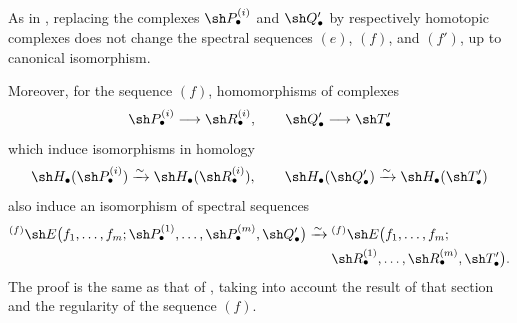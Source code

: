 \begin{remark}[6.9.5]
\label{III.6.9.5}
As in , replacing the complexes
$\sh P_\bullet^{(i)}$ and $\sh Q_\bullet'$ by respectively
homotopic complexes does not change the spectral sequences $(e)$,
$(f)$, and $(f')$, up to canonical isomorphism.

Moreover, for the sequence $(f)$, homomorphisms of complexes
\[
  \sh P_\bullet^{(i)}\longrightarrow\sh R_\bullet^{(i)},
  \qquad
  \sh Q_\bullet'\longrightarrow\sh T_\bullet'
\]
which induce isomorphisms in homology
\[
  \sh H_\bullet(\sh P_\bullet^{(i)})
  \xrightarrow{\sim}
  \sh H_\bullet(\sh R_\bullet^{(i)}),
  \qquad
  \sh H_\bullet(\sh Q_\bullet')
  \xrightarrow{\sim}
  \sh H_\bullet(\sh T_\bullet')
\]
also induce an isomorphism of spectral sequences
\[
\begin{split}
  {}^{(f)}\sh E
  \bigl(
    f_1,\ldots,f_m;
    \sh P_\bullet^{(1)},\ldots,\sh P_\bullet^{(m)},
    \sh Q_\bullet'
  \bigr)
  \xrightarrow{\sim}\;&
  {}^{(f)}\sh E
  \bigl(
    f_1,\ldots,f_m;
    \\
    &
    \sh R_\bullet^{(1)},\ldots,\sh R_\bullet^{(m)},
    \sh T_\bullet'
  \bigr).
\end{split}
\]
The proof is the same as that of , taking into
account the result of that section and the regularity of the
sequence $(f)$.
\end{remark}

